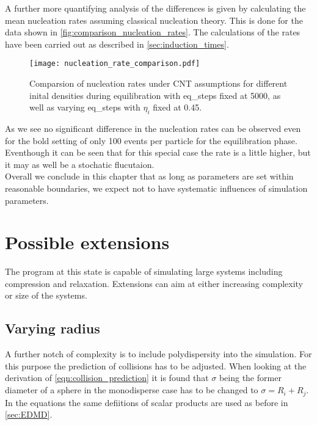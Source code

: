 A further more quantifying analysis of the differences is given by calculating the mean nucleation rates assuming classical nucleation theory. This is done for the data shown in \autoref{fig:comparison_nucleation_rates}. The calculations of the rates have been carried out as described in \autoref{sec:induction_times}.

\begin{figure}[h!]
\centering
\texttt{[image: nucleation\_rate\_comparison.pdf]}
\caption{Comparsion of nucleation rates under CNT assumptions for different inital densities during equilibration with eq\_steps fixed at 5000, as well as varying eq\_steps with $\eta_i$ fixed at 0.45. }
\label{fig:comparison_nucleation_rates}
\end{figure}

As we see no significant difference in the nucleation rates can be observed even for the bold setting of only 100 events per particle for the equilibration phase. Eventhough it can be seen that for this special case the rate is a little higher, but it may as well be a stochatic flucutaion.\\

Overall we conclude in this chapter that as long as parameters are set within reasonable boundaries, we expect not to have systematic influences of simulation parameters. 



\section{Possible extensions}
\label{sec:simulation_ext}
The program at this state is capable of simulating large systems including compression and relaxation. Extensions can aim at either increasing complexity or size of the systems. 

\subsection{Varying radius}
\label{sec:extension_radius}
A further notch of complexity is to include polydispersity into the simulation. For this purpose the prediction of collisions has to be adjusted. When looking at the derivation of \autoref{eqn:collision_prediction} it is found that $\sigma$ being the former diameter of a sphere in the monodisperse case has to be changed to $\sigma=R_i+R_j$. In the equations the same defiitions of scalar products are used as before in \autoref{sec:EDMD}.

